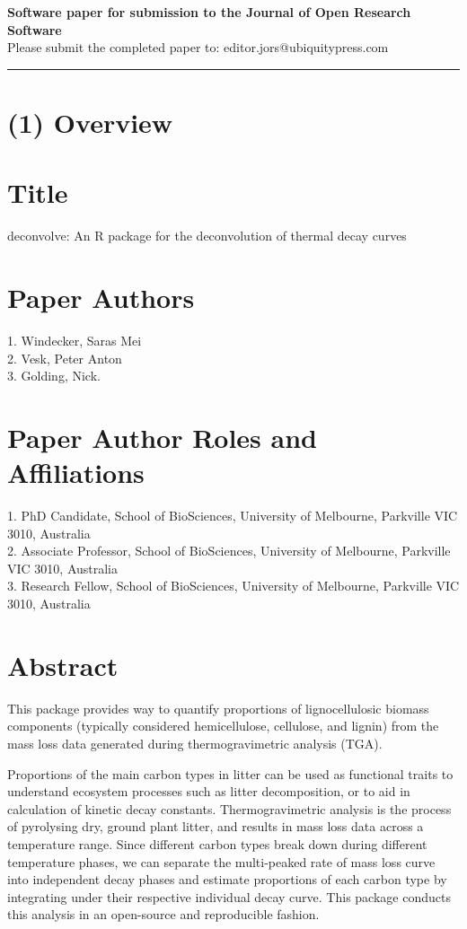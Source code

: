 \documentclass{jors}\usepackage[]{graphicx}\usepackage[]{color}
\begin{document}
{\bf Software paper for submission to the Journal of Open Research Software} \\

Please submit the completed paper to: editor.jors@ubiquitypress.com

\rule{\textwidth}{1pt}

\section*{(1) Overview}

\vspace{0.5cm}

\section*{Title}
deconvolve: An R package for the deconvolution of thermal decay curves

\section*{Paper Authors}
1. Windecker, Saras Mei \\
2. Vesk, Peter Anton \\
3. Golding, Nick.

\section*{Paper Author Roles and Affiliations}
1. PhD Candidate, School of BioSciences, University of Melbourne, Parkville VIC 3010, Australia \\
2. Associate Professor, School of BioSciences, University of Melbourne, Parkville VIC 3010, Australia \\
3. Research Fellow, School of BioSciences, University of Melbourne, Parkville VIC 3010, Australia

\section*{Abstract}
This package provides way to quantify proportions of lignocellulosic biomass components (typically considered hemicellulose, cellulose, and lignin) from the mass loss data generated during thermogravimetric analysis (TGA).

Proportions of the main carbon types in litter can be used as functional traits to understand ecosystem processes such as litter decomposition, or to aid in calculation of kinetic decay constants. Thermogravimetric analysis is the process of pyrolysing dry, ground plant litter, and results in mass loss data across a temperature range. Since different carbon types break down during different temperature phases, we can separate the multi-peaked rate of mass loss curve into independent decay phases and estimate proportions of each carbon type by integrating under their respective individual decay curve. This package conducts this analysis in an open-source and reproducible fashion.
\end{document}
